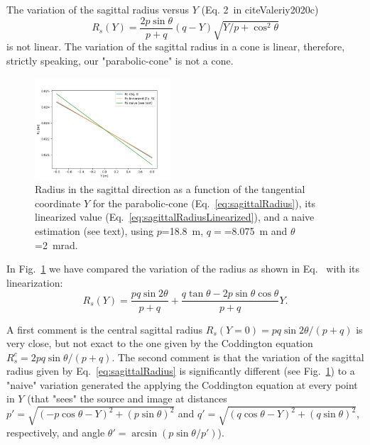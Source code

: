 \documentclass[a4paper, 11pt]{article}
\begin{document}
The variation of the sagittal radius versus $Y$  (Eq. 2\ in cite{Valeriy2020c})
\begin{equation}
\label{eq:sagittalRadius}
R_s(Y) = \frac{2  p \sin\theta}{p + q} (q - Y)   \sqrt{Y / p + \cos^2\theta}
\end{equation}
is not linear. The variation of the sagittal radius in a cone is linear, therefore, strictly speaking, our "parabolic-cone" is not a cone. 

\begin{figure}[h]
\centering
\includegraphics[width=0.45\textwidth]{figures/sagittalradius.png}
\caption{\label{fig:sagittalRadius}Radius in the sagittal direction as a function of the tangential coordinate $Y$ for the parabolic-cone (Eq.~\ref{eq:sagittalRadius}), its linearized value (Eq.~\ref{eq:sagittalRadiusLinearized}), and a naive estimation (see text), using $p$=18.8~m, $q=$=8.075~m and $\theta$=2~mrad.
}
\end{figure}


In Fig.~\ref{fig:sagittalRadius} we have compared the variation of the radius as shown in Eq.~\label{eq:sagittalRadius} with its linearization:
\begin{equation}
\label{eq:sagittalRadiusLinearized}
R_s(Y) = \frac{p q \sin2\theta  }{p + q} + \frac{q \tan\theta - 2 p \sin\theta \cos\theta}{p + q} Y.
\end{equation}



A first comment is the central sagittal radius $R_s(Y=0)=p q \sin2\theta / (p+q)$ is very close, but not exact to the one given by the Coddington equation $R_s^c=2 p q \sin\theta / (p+q)$. The second comment is that the variation of the sagittal radius given by Eq.~\ref{eq:sagittalRadius} is significantly different (see Fig.~\ref{fig:sagittalRadius}) to a "naive" variation generated the applying the Coddington equation at every point in $Y$ (that "sees" the source and image at distances $p'=\sqrt{(-p \cos\theta - Y)^2 + (p \sin\theta)^2}$ and $q'=\sqrt{(q \cos\theta - Y)^2 + (q \sin\theta)^2}$, respectively, and angle $\theta'=\arcsin(p \sin\theta / p')$).
\end{document}
